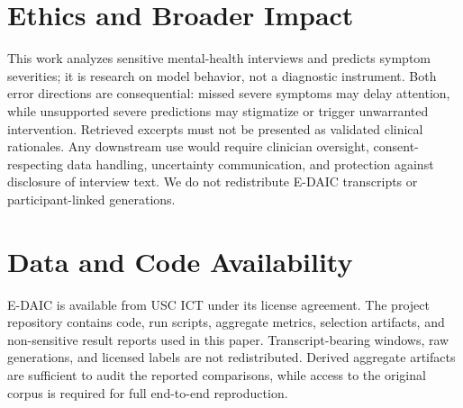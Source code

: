 \documentclass{article}
\begin{document}
\section*{Ethics and Broader Impact}
This work analyzes sensitive mental-health interviews and predicts symptom severities; it is research on model behavior, not a diagnostic instrument. Both error directions are consequential: missed severe symptoms may delay attention, while unsupported severe predictions may stigmatize or trigger unwarranted intervention. Retrieved excerpts must not be presented as validated clinical rationales. Any downstream use would require clinician oversight, consent-respecting data handling, uncertainty communication, and protection against disclosure of interview text. We do not redistribute E-DAIC transcripts or participant-linked generations.

\section*{Data and Code Availability}
E-DAIC is available from USC ICT under its license agreement. The project repository contains code, run scripts, aggregate metrics, selection artifacts, and non-sensitive result reports used in this paper. Transcript-bearing windows, raw generations, and licensed labels are not redistributed. Derived aggregate artifacts are sufficient to audit the reported comparisons, while access to the original corpus is required for full end-to-end reproduction.



\end{document}
